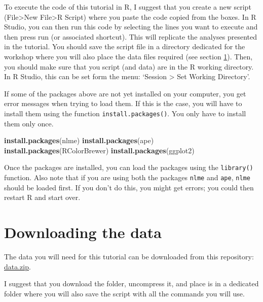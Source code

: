 \documentclass[
]{book}
\newenvironment{Shaded}{\begin{snugshade}}{\end{snugshade}}
\newcommand{\FunctionTok}[1]{\textcolor[rgb]{0.13,0.29,0.53}{\textbf{#1}}}
\newcommand{\NormalTok}[1]{#1}
\newcommand{\StringTok}[1]{\textcolor[rgb]{0.31,0.60,0.02}{#1}}
\begin{document}
To execute the code of this tutorial in R, I suggest that you create a new script (File\textgreater New File\textgreater R Script) where you paste the code copied from the boxes. In R Studio, you can then run this code by selecting the lines you want to execute and then press run (or associated shortcut). This will replicate the analyses presented in the tutorial. You should save the script file in a directory dedicated for the workshop where you will also place the data files required (see section \ref{download}). Then, you should make sure that you script (and data) are in the R working directory. In R Studio, this can be set form the menu: `Session \textgreater{} Set Working Directory'.

If some of the packages above are not yet installed on your computer, you get error messages when trying to load them. If this is the case, you will have to install them using the function \texttt{install.packages()}. You only have to install them only once.

\begin{Shaded}
\begin{Highlighting}[]
\FunctionTok{install.packages}\NormalTok{(}\StringTok{\textquotesingle{}nlme\textquotesingle{}}\NormalTok{)}
\FunctionTok{install.packages}\NormalTok{(}\StringTok{\textquotesingle{}ape\textquotesingle{}}\NormalTok{)}
\FunctionTok{install.packages}\NormalTok{(}\StringTok{\textquotesingle{}RColorBrewer\textquotesingle{}}\NormalTok{)}
\FunctionTok{install.packages}\NormalTok{(}\StringTok{\textquotesingle{}ggplot2\textquotesingle{}}\NormalTok{)}
\end{Highlighting}
\end{Shaded}

Once the packages are installed, you can load the packages using the \texttt{library()} function. Also note that if you are using both the packages \texttt{nlme} and \texttt{ape}, \texttt{nlme} should be loaded first. If you don't do this, you might get errors; you could then restart R and start over.

\section{Downloading the data}\label{download}

The data you will need for this tutorial can be downloaded from this repository: \href{https://simjoly.github.io/ComparativeMethods-HalfDayWorkshop/data.zip}{data.zip}.

I suggest that you download the folder, uncompress it, and place is in a dedicated folder where you will also save the script with all the commands you will use.
\end{document}
